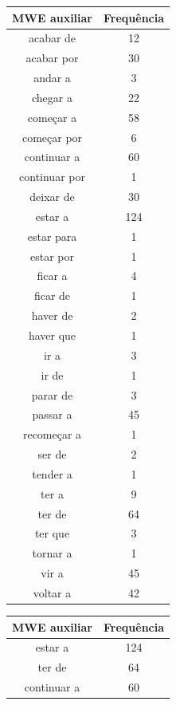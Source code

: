 \documentclass[output=paper,colorlinks,citecolor=brown]{langscibook}
\begin{document}
	\begin{table}[]
		\parbox{.45\linewidth}{
			\centering
			\begin{tabular}{|c|c|}
				\hline
				\textbf{MWE auxiliar} & \textbf{Frequência} \\\hline
				acabar de & 12\\\hline
				acabar por & 30\\\hline
				andar a & 3\\\hline
				chegar a & 22\\\hline
				começar a & 58\\\hline
				começar por & 6\\\hline
				continuar a & 60\\\hline
				continuar por & 1\\\hline
				deixar de & 30\\\hline
				estar a & 124\\\hline
				estar para & 1\\\hline
				estar por & 1\\\hline
				ficar a & 4\\\hline
				ficar de & 1\\\hline
				haver de & 2\\\hline
				haver que & 1\\\hline
				ir a & 3\\\hline
				ir de & 1\\\hline
				parar de & 3\\\hline
				passar a & 45\\\hline
				recomeçar a & 1\\\hline
				ser de & 2\\\hline
				tender a & 1\\\hline
				ter a & 9\\\hline
				ter de & 64\\\hline
				ter que & 3\\\hline
				tornar a & 1\\\hline
				vir a & 45\\\hline
				voltar a & 42\\\hline
			\end{tabular}
		}
		\hfill
		\parbox{.45\linewidth}{
			\centering
			\begin{tabular}{|c|c|}
				\hline
				\textbf{MWE auxiliar} & \textbf{Frequência} \\\hline
				estar a & 124\\\hline
				ter de & 64\\\hline
				continuar a & 60\\\hline

\end{tabular}}
\end{table}
\end{document}
